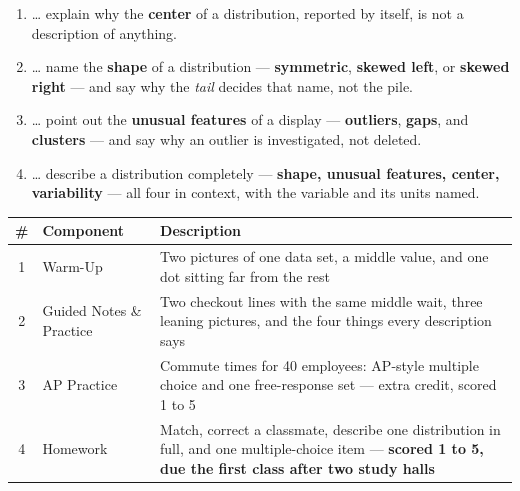 \documentclass[12pt]{article}
\begin{document}

\namedateperiod
\vspace{0.18in}

\boxguard[14]
\begin{learningtargetbox}
\small
\begin{enumerate}[leftmargin=1.5em, itemsep=5pt]
  \item \ldots{} explain why the \textbf{center} of a distribution, reported by itself, is not a
        description of anything.
  \item \ldots{} name the \textbf{shape} of a distribution --- \textbf{symmetric},
        \textbf{skewed left}, or \textbf{skewed right} --- and say why the \emph{tail} decides
        that name, not the pile.
  \item \ldots{} point out the \textbf{unusual features} of a display --- \textbf{outliers},
        \textbf{gaps}, and \textbf{clusters} --- and say why an outlier is investigated, not deleted.
  \item \ldots{} describe a distribution completely --- \textbf{shape, unusual features,
        center, variability} --- all four in context, with the variable and its units named.
\end{enumerate}
\end{learningtargetbox}

\vspace{0.14in}

\boxguard[14]
\begin{tocbox}
\small
\renewcommand{\arraystretch}{1.5}
\begin{tabularx}{\linewidth}{@{} c l X @{}}
\rowcolor{sky}
\textbf{\#} & \textbf{Component} & \textbf{Description} \\
\midrule
1 & Warm-Up & Two pictures of one data set, a middle value, and one dot sitting far from
                 the rest \\
2 & Guided Notes \& Practice & Two checkout lines with the same middle wait, three leaning
                 pictures, and the four things every description says \\
3 & AP Practice & Commute times for 40 employees: AP-style multiple choice and one
                 free-response set --- extra credit, scored 1 to 5 \\
4 & Homework & Match, correct a classmate, describe one distribution in full, and one
                 multiple-choice item --- \textbf{scored 1 to 5, due the first class after two study
                 halls} \\
\end{tabularx}
\end{tocbox}
\end{document}
